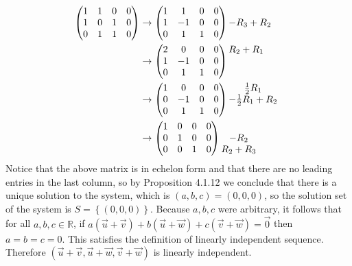 \documentclass[12pt]{article}
\newenvironment{problem}[2][Problem]
{
	\begin{trivlist} 
		\item[\hskip \labelsep {\bfseries #1 #2:}]
	}
{
	\end{trivlist}
	}
\newenvironment{solution}[1][Solution]
{
	\begin{trivlist} 
		\item[\hskip \labelsep {\itshape #1:}]
	}
	{
	\end{trivlist}
}
\begin{document}
\begin{problem}{2}
\begin{solution}
\begin{align*}
\begin{pmatrix}1&1&0&0\\1&0&1&0\\0&1&1&0\end{pmatrix} & \rightarrow  \begin{pmatrix}1&1&0&0\\1&-1&0&0\\0&1&1&0\end{pmatrix} \begin{matrix} \hphantom{1} \\ -R_3 + R_2 \hphantom{1} \\ \hphantom{1} \end{matrix} \\
&\rightarrow \begin{pmatrix}2&0&0&0\\1&-1&0&0\\0&1&1&0\end{pmatrix} \begin{matrix} R_2 + R_1 \hphantom{1}\\\hphantom{1} \\ \hphantom{1} \end{matrix} \\
&\rightarrow \begin{pmatrix}1&0&0&0\\0&-1&0&0\\0&1&1&0\end{pmatrix} \begin{matrix} \frac{1}{2} R_1 \hphantom{1}\\ -\frac{1}{2}R_1 +R_2\hphantom{1} \\ \hphantom{1} \end{matrix} \\
&\rightarrow \begin{pmatrix}1&0&0&0\\0&1&0&0\\0&0&1&0\end{pmatrix} \begin{matrix} \hphantom{1}\\ -R_2\hphantom{1} \\ R_2 + R_3\hphantom{1} \end{matrix}
\end{align*}
Notice that the above matrix is in echelon form and that there are no leading entries in the last column, so by Proposition 4.1.12 we conclude that there is a unique solution to the system, which is $(a,b,c) = (0,0,0)$, so the solution set of the system is $S = \left \{ (0,0,0) \right \}$. Because $a,b,c$ were arbitrary, it follows that for all $a,b,c \in \mathbb{R}$, if $a(\vec{u} +\vec{v}) + b(\vec{u}+\vec{w})+c(\vec{v}+\vec{w}) =\vec{0}$ then $a=b=c=0$. This satisfies the definition of linearly independent sequence. Therefore $(\vec{u}+\vec{v}, \vec{u}+\vec{w},\vec{v}+\vec{w})$ is linearly independent.
\end{solution}
\end{problem}
\end{document}
